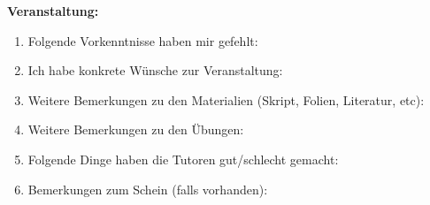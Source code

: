 \documentclass[10pt,a4paper]{article}
\begin{document}
\textbf{Veranstaltung:}\hspace{0.1cm} \underline{\hspace{7cm}}
\begin{enumerate}
	\item Folgende Vorkenntnisse haben mir gefehlt:
	
	\underline{\hspace{15.9cm}}
	
	\underline{\hspace{15.9cm}}
	\vspace{0.1pt}
	\item Ich habe konkrete Wünsche zur Veranstaltung:
	
	\underline{\hspace{15.9cm}}
	
	\underline{\hspace{15.9cm}}
	
	\underline{\hspace{15.9cm}}
	\vspace{0.1pt}
	
	\item Weitere Bemerkungen zu den Materialien (Skript, Folien, Literatur, etc):
	
	\underline{\hspace{15.9cm}}
	
	\underline{\hspace{15.9cm}}
	
	\underline{\hspace{15.9cm}}
	\vspace{0.1pt}
	
	\item Weitere Bemerkungen zu den Übungen:
	
	\underline{\hspace{15.9cm}}
	
	\underline{\hspace{15.9cm}}
	
	\underline{\hspace{15.9cm}}
	\vspace{0.1pt}
	
	\item Folgende Dinge haben die Tutoren gut/schlecht gemacht:
	
	\underline{\hspace{15.9cm}}
	
	\underline{\hspace{15.9cm}}
	
	\underline{\hspace{15.9cm}}
	\vspace{0.1pt}
	
	\item Bemerkungen zum Schein (falls vorhanden):
	
	\underline{\hspace{15.9cm}}
	
	\underline{\hspace{15.9cm}}
	
	\underline{\hspace{15.9cm}}
	
\end{enumerate}
\end{document}
